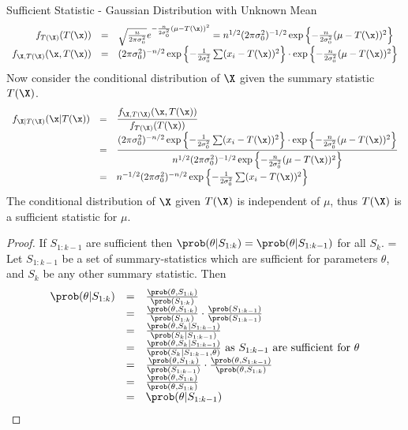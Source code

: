 \documentclass[11pt,a4paper]{article}
\begin{document}
\begin{example}{Sufficient Statistic - Gaussian Distribution with Unknown Mean}
\[\begin{array}{rcl}
      f_{T(\X)}(T(\x))&=&\sqrt{\frac{n}{2\pi\sigma_0^2}}e^{-\frac{n}{2\sigma_0^2}(\mu-T(\x))^2}=n^{1/2}(2\pi\sigma_0^2)^{-1/2}\exp\left\{-\frac{n}{2\sigma_0^2}(\mu-T(\x))^2\right\}\\
      f_{\X,T(\X)}(\x,T(\x))&=&(2\pi\sigma_0^2)^{-n/2}\exp\left\{-\frac1{2\sigma_0^2}\sum(x_i-T(\x))^2\right\}\cdot\exp\left\{-\frac{n}{2\sigma_0^2}(\mu-T(\x))^2\right\}\\
    \end{array}\]
    Now consider the conditional distribution of $\X$ given the summary statistic $T(\X)$.
    \[\begin{array}{rcl}
      f_{\X|T(\X)}(\x|T(\x))&=&\dfrac{f_{\X,T(\X)}(\x,T(\x))}{f_{T(\X)}(T(\x))}\\
      &=&\dfrac{(2\pi\sigma_0^2)^{-n/2}\exp\left\{-\frac1{2\sigma_0^2}\sum(x_i-T(\x))^2\right\}\cdot\exp\left\{-\frac{n}{2\sigma_0^2}(\mu-T(\x))^2\right\}}{n^{1/2}(2\pi\sigma_0^2)^{-1/2}\exp\left\{-\frac{n}{2\sigma_0^2}(\mu-T(\x))^2\right\}}\\
      &=&n^{-1/2}(2\pi\sigma_0^2)^{-n/2}\exp\left\{-\frac1{2\sigma_0^2}\sum(x_i-T(\x))^2\right\}
    \end{array}\]
    The conditional distribution of $\X$ given $T(\X)$ is independent of $\mu$, thus $T(\X)$ is a sufficient statistic for $\mu$.
  \end{example}

  \begin{proof}{If $S_{1:k-1}$ are sufficient then $\prob(\theta|S_{1:k})=\prob(\theta|S_{1:k-1})$ for all $S_k$.}
    \everymath={\displaystyle}
    Let $S_{1:k-1}$ be a set of summary-statistics which are sufficient for parameters $\theta$, and $S_k$ be any other summary statistic. Then
    \[\begin{array}{rcl}
      \prob(\theta|S_{1:k})&=&\frac{\prob(\theta,S_{1:k})}{\prob(S_{1:k})}\\
      &=&\frac{\prob(\theta,S_{1:k})}{\prob(S_{1:k})}\cdot\frac{\prob(S_{1:k-1})}{\prob(S_{1:k-1})}\\
      &=&\frac{\prob(\theta,S_k|S_{1:k-1})}{\prob(S_k|S_{1:k-1})}\\
      &=&\frac{\prob(\theta,S_k|S_{1:k-1})}{\prob(S_k|S_{1:k-1},\theta)}\text{ as }S_{1:k-1}\text{ are sufficient for }\theta\\
      &=&\frac{\prob(\theta,S_{1:k})}{\prob(S_{1:k-1})}\cdot\frac{\prob(\theta,S_{1:k-1})}{\prob(\theta,S_{1:k})}\\
      &=&\frac{\prob(\theta,S_{1:k})}{\prob(\theta,S_{1:k})}\\
      &=&\prob(\theta|S_{1:k-1})
    \end{array}\]
  \end{proof}
\end{document}
